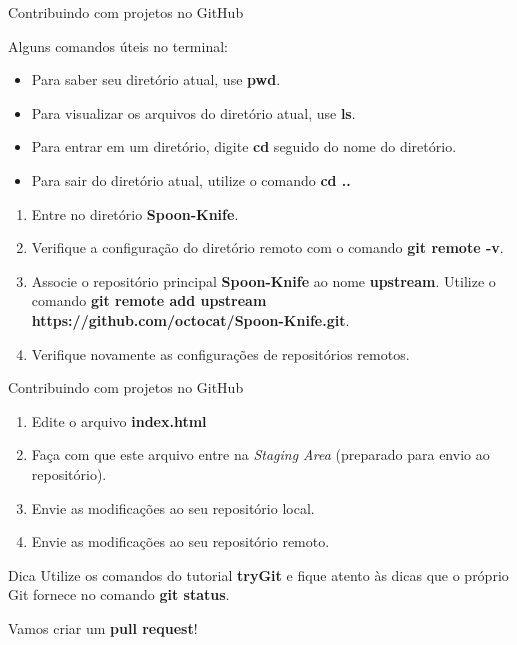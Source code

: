 \documentclass[a4paper]{beamer}
\begin{document}
\begin{frame}{Contribuindo com projetos no GitHub}

\begin{block}{}
Alguns comandos úteis no terminal:
\begin{itemize}
\item Para saber seu diretório atual, use \textbf{pwd}.
\item Para visualizar os arquivos do diretório atual, use \textbf{ls}.
\item Para entrar em um diretório, digite \textbf{cd} seguido do nome do diretório.
\item Para sair do diretório atual, utilize o comando \textbf{cd ..}
\end{itemize}
\end{block}

\pause
\begin{enumerate}
\item Entre no diretório \textbf{Spoon-Knife}.
\item Verifique a configuração do diretório remoto com o comando \textbf{git remote -v}.
\item Associe o repositório principal \textbf{Spoon-Knife} ao nome \textbf{upstream}. Utilize o comando \textbf{git remote add upstream https://github.com/octocat/Spoon-Knife.git}.
\item Verifique novamente as configurações de repositórios remotos.
\end{enumerate}

\end{frame}

\begin{frame}{Contribuindo com projetos no GitHub}

\begin{enumerate}
\item Edite o arquivo \textbf{index.html}
\item Faça com que este arquivo entre na \textit{Staging Area} (preparado para envio ao repositório).
\item Envie as modificações ao seu repositório local.
\item Envie as modificações ao seu repositório remoto.
\end{enumerate}

\begin{block}{Dica}
Utilize os comandos do tutorial \textbf{tryGit} e fique atento às dicas que o próprio Git fornece no comando \textbf{git status}.
\end{block}

\pause
\begin{center}
Vamos criar um \textbf{pull request}!
\end{center}

\end{frame}
\end{document}
